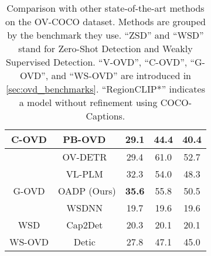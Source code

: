 \documentclass[10pt,twocolumn,letterpaper]{article}
\begin{document}
\begin{table}[t]
{\begin{tabular}{cc|ccc}
      \multirow{-5}{*}{C-OVD} & PB-OVD~\cite{pb_ovd}          & 29.1                              & \color{Dim Gray} 44.4                     & \color{Dim Gray} 40.4                     \\ \midrule
                              & OV-DETR~\cite{ov_detr}        & 29.4                              & \color{Dim Gray} 61.0                     & \color{Dim Gray} 52.7                     \\
                              & VL-PLM~\cite{vl_plm}          & 32.3                              & \color{Dim Gray} 54.0                     & \color{Dim Gray} 48.3                     \\
      \multirow{-3}{*}{G-OVD} & OADP (Ours)                   & \cellcolor{Platinum}\textbf{35.6} & \cellcolor{Platinum}\color{Dim Gray} 55.8 & \cellcolor{Platinum}\color{Dim Gray} 50.5 \\ \midrule
                              & WSDNN~\cite{wsdnn}            & 19.7                              & \color{Dim Gray} 19.6                     & \color{Dim Gray} 19.6                     \\
      \multirow{-2}{*}{WSD}   & Cap2Det~\cite{cap2det}        & 20.3                              & \color{Dim Gray} 20.1                     & \color{Dim Gray} 20.1                     \\ \midrule
      WS-OVD                  & Detic~\cite{detic}            & 27.8                              & \color{Dim Gray} 47.1                     & \color{Dim Gray} 45.0                     \\ \bottomrule
    \end{tabular}}
  \caption{
    Comparison with other state-of-the-art methods on the OV-COCO dataset.
    Methods are grouped by the benchmark they use.
    ``ZSD'' and ``WSD'' stand for Zero-Shot Detection and Weakly Supervised Detection.
    ``V-OVD'', ``C-OVD'', ``G-OVD'', and ``WS-OVD'' are introduced in \cref{sec:ovd_benchmarks}.
    ``RegionCLIP*'' indicates a model without refinement using COCO-Captions.
  }
  \label{tab:coco_sota}
\end{table}
 
\end{document}
